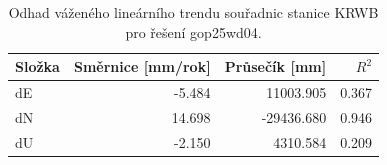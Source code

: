 \begin{table}[htbp]
\caption{Odhad váženého lineárního trendu souřadnic stanice KRWB pro řešení gop25wd04.}
\label{tab:gop25wd04_stcd_krwb_weighted_1seg}
\begin{tabular}{lrrr}
\toprule
Složka & Směrnice [mm/rok] & Průsečík [mm] & $R^2$ \\
\midrule
dE & -5.484 & 11003.905 & 0.367 \\
dN & 14.698 & -29436.680 & 0.946 \\
dU & -2.150 & 4310.584 & 0.209 \\
\bottomrule
\end{tabular}
\end{table}
